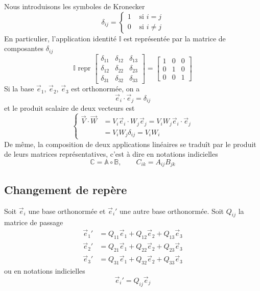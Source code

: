 Nous introduisons les symboles de Kronecker
\begin{equation}
    \delta_{ij} = 
    \begin{cases} 
        1 & \text{ si } i = j\\
        0 & \text{ si } i \neq j
    \end{cases}
    \label{eq:AnnA-004}
\end{equation}
En particulier, l'application identité $\mathbb{I}$ est représentée par la matrice de composantes $\delta_{ij}$
\begin{displaymath}
    \mathbb{I} \text{ repr } 
    \begin{bmatrix}
        \delta_{11} & \delta_{12} & \delta_{13} \\
        \delta_{12} & \delta_{22} & \delta_{23} \\
        \delta_{31} & \delta_{32} & \delta_{33} 
    \end{bmatrix}
    =
    \begin{bmatrix}
        1 & 0 & 0 \\
        0 & 1 & 0 \\
        0 & 0 & 1
    \end{bmatrix}
\end{displaymath}
Si la base $\vec{e}_1$, $\vec{e}_2$, $\vec{e}_3$ est orthonormée, on a
\begin{equation}
    \vec{e}_i \cdot \vec{e}_j = \delta_{ij}
    \label{eq:AnnA-005}
\end{equation}
et le produit scalaire de deux vecteurs est
\begin{equation}
    \left\{
    \begin{aligned}
        \vec{V} \cdot \vec{W} &= V_i \vec{e}_i \cdot W_j \vec{e}_j = V_i W_j \vec{e}_i \cdot \vec{e}_j \\
        & = V_i W_j \delta_{ij}  =V_i W_i
    \end{aligned}
    \right.
    \label{eq:AnnA-006}
\end{equation}
De même, la composition de deux applications linéaires se traduît par le produit de leurs matrices représentatives, c'est à dire en notations indicielles
\begin{equation}
    \mathbb{C} = \mathbb{A} \circ \mathbb{B}, \qquad C_{ik} = A_{ij} B_{jk}
    \label{eq:AnnA-007}
\end{equation}
\subsection{Changement de repère}
Soit $\vec{e}_i$ une base orthonormée et $\vec{e}_i{}'$ une autre base orthonormée.
Soit $Q_{ij}$ la matrice de passage
\begin{align*}
    \vec{e}_1{}' &= Q_{11} \vec{e}_1 + Q_{12} \vec{e}_2 + Q_{13} \vec{e}_3 \\
    \vec{e}_2{}' &= Q_{21} \vec{e}_1 + Q_{22} \vec{e}_2 + Q_{23} \vec{e}_3 \\
    \vec{e}_3{}' &= Q_{31} \vec{e}_1 + Q_{32} \vec{e}_2 + Q_{33} \vec{e}_3 
\end{align*}
ou en notations indicielles
\begin{equation}
    \vec{e}_i{}' = Q_{ij} \vec{e}_j
    \label{eq:AnnA-008}
\end{equation}


